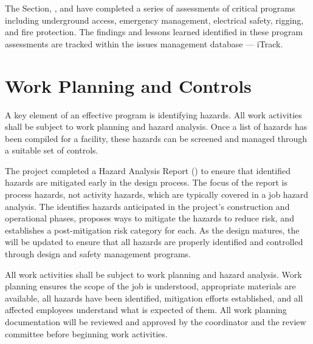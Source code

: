 The \fnal {} Section, , and
  have completed a series of assessments of
critical   programs including underground access,
emergency management, electrical safety, rigging, and fire
protection. The findings and lessons learned identified in these
 program assessments are tracked within the \fnal issues management
database --- iTrack.

\section{Work Planning and Controls}\label{sec:es-tc-eshq-har}

A key element of an effective  program is identifying hazards. All work activities
shall be subject to work planning and hazard analysis.  
Once a list of hazards has been compiled for a facility, these hazards can be screened
and managed through a suitable set of controls.

The  project completed a Hazard Analysis Report ()
to ensure that identified hazards are mitigated early in the
design process.  The focus of the report is process hazards,
not activity hazards, which are typically covered in a job hazard
analysis.  The   identifies
hazards anticipated in the project's construction and operational
phases, proposes ways to mitigate the hazards to reduce risk, and establishes a
post-mitigation risk category for each.  As the  design 
matures, the  will be
updated to ensure that all hazards are properly identified and
controlled through design and safety management programs.



All work activities
shall be subject to work planning and hazard analysis. 
Work planning ensures the scope of
the job is understood, appropriate materials are available, all
hazards have been identified, mitigation efforts established, and all
affected employees understand what is expected of them.   
All work planning documentation will be reviewed and
approved by the   coordinator and the 
 review committee before beginning work activities.

